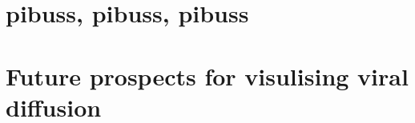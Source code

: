 \section{pibuss, pibuss, pibuss}



\section{Future prospects for visulising viral diffusion}
















